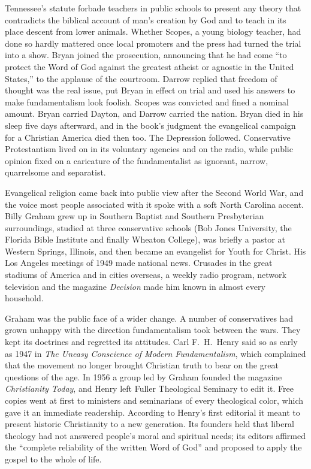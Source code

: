 Tennessee's statute forbade teachers in public schools to present any theory that contradicts the
biblical account of man's creation by God and to teach in its place descent from lower animals.
Whether Scopes, a young biology teacher, had done so hardly mattered once local promoters and the
press had turned the trial into a show. Bryan joined the prosecution, announcing that he had come
``to protect the Word of God against the greatest atheist or agnostic in the United States,'' to the
applause of the courtroom. Darrow replied that freedom of thought was the real issue, put Bryan in
effect on trial and used his answers to make fundamentalism look foolish. Scopes was convicted and
fined a nominal amount. Bryan carried Dayton, and Darrow carried the nation. Bryan died in his sleep
five days afterward, and in the book's judgment the evangelical campaign for a Christian America died
then too. The Depression followed. Conservative Protestantism lived on in its voluntary agencies and
on the radio, while public opinion fixed on a caricature of the fundamentalist as ignorant, narrow,
quarrelsome and separatist.

Evangelical religion came back into public view after the Second World War, and the voice most
people associated with it spoke with a soft North Carolina accent. Billy Graham grew up in Southern
Baptist and Southern Presbyterian surroundings, studied at three conservative schools (Bob Jones University, the Florida Bible Institute and finally Wheaton College), was briefly a pastor at Western Springs, Illinois, and then became an
evangelist for Youth for Christ. His Los Angeles meetings of 1949 made national news. Crusades in the
great stadiums of America and in cities overseas, a weekly radio program, network television and the
magazine \emph{Decision} made him known in almost every household.

Graham was the public face of a wider change. A number of conservatives had grown unhappy with the
direction fundamentalism took between the wars. They kept its doctrines and regretted its attitudes.
Carl F.~H.~Henry said so as early as 1947 in \emph{The Uneasy Conscience of Modern Fundamentalism},
which complained that the movement no longer brought Christian truth to bear on the great questions
of the age. In 1956 a group led by Graham founded the magazine \emph{Christianity Today}, and Henry
left Fuller Theological Seminary to edit it. Free copies went at first to ministers and seminarians
of every theological color, which gave it an immediate readership. According to Henry's first
editorial it meant to present historic Christianity to a new generation. Its founders held that
liberal theology had not answered people's moral and spiritual needs; its editors affirmed the
``complete reliability of the written Word of God'' and proposed to apply the gospel to the whole of
life.

